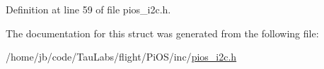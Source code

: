 \-Definition at line 59 of file pios\-\_\-i2c.\-h.



\-The documentation for this struct was generated from the following file\-:\begin{DoxyCompactItemize}
\item 
/home/jb/code/\-Tau\-Labs/flight/\-Pi\-O\-S/inc/\hyperlink{_pi_o_s_2inc_2pios__i2c_8h}{pios\-\_\-i2c.\-h}\end{DoxyCompactItemize}
